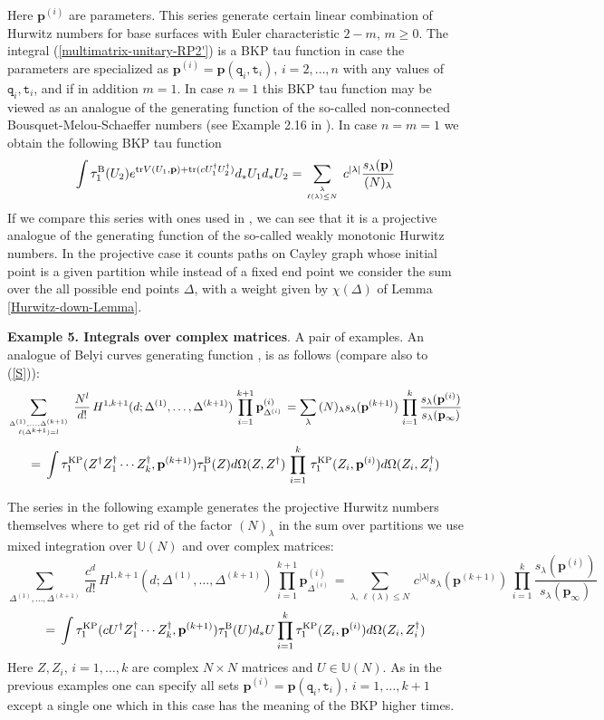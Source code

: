 \documentclass[a4paper,10pt]{article}
\newcommand{\bpow}{\mathbf{p}}
\theoremstyle{plain}
\theoremstyle{remark}
\def\tr{\mathrm {tr}}
\def\be{\begin{equation}}
\def\ee{\end{equation}}
\def\tr{\mathrm {tr}}
\begin{document}
Here $\bpow^{(i)}$ are parameters. This series generate certain linear combination of Hurwitz numbers for base surfaces
with Euler characteristic $2-m,\,m\ge 0$.
The integral (\ref{multimatrix-unitary-RP2'}) is a BKP tau function in case the parameters
are specialized as $\bpow^{(i)}=\bpow(\texttt{q}_i,\texttt{t}_i),\,i=2,\dots,n$ with any values of
$\texttt{q}_i,\texttt{t}_i$,
and if in addition $m=1$. In case $n=1$ this BKP tau function may be viewed as an analogue of the generating function of
the so-called non-connected Bousquet-Melou-Schaeffer numbers
(see Example 2.16 in \cite{KazarianLando}).
In case $n=m=1$ we obtain the following BKP tau function
\[
\int \tau^{\rm B}_1(U_2)  e^{\tr V(U_1,\bpow)+\tr (cU_1^\dag U_2^\dag)}d_*U_1d_*U_2 =
\sum_{\lambda\atop \ell(\lambda)\le N}\,c^{|\lambda|}\frac{s_\lambda(\bpow)}{(N)_\lambda}
\]
If we compare this series with ones used in \cite{Goulden-Paquet-Novak},\cite{Harnad-2014} we can see that it is a projective analogue of the generating function of the
so-called weakly monotonic Hurwitz numbers. In the projective case it counts paths on Cayley graph whose initial point is a given partition
while instead of a fixed end point we consider the sum over the all possible end points $\Delta$, 
with a weight given by $\chi(\Delta)$ of Lemma \ref{Hurwitz-down-Lemma}.



{\bf Example 5. Integrals over complex matrices}.
A pair of examples. 
An analogue of Belyi curves generating function \cite{Zog},\cite{Chekhov-2014} is as follows
 (compare also to (\ref{S})):
\be
\sum_{ \Delta^{(1)},\dots,\Delta^{(k+1)}\atop \ell(\Delta^{k+1})=l}\,\frac{N^l}{d!}\,
H^{1,k+1}(d;\Delta^{(1)},\dots,\Delta^{(k+1)})\,
\prod_{i=1}^{k+1} \bpow^{(i)}_{\Delta^{(i)}}\,
=\sum_{\lambda}\,(N)_\lambda s_\lambda(\bpow^{(k+1)})\,
\prod_{i=1}^{k}\frac{s_\lambda(\bpow^{(i)})}{s_\lambda(\bpow_\infty)}
\ee
\be
=\,\int \tau_1^{\rm KP}(Z^\dag Z_1^\dag \cdots Z_k^\dag,\bpow^{(k+1)})\tau_1^{\rm B}(Z)d\Omega(Z,Z^\dag)
\,\prod_{i=1}^{k}\,\tau_1^{\rm KP}(Z_i,\bpow^{(i)})  d\Omega(Z_i,Z_i^\dag)
\ee

The series in the following example generates the projective Hurwitz numbers themselves where to get rid
of the factor $(N)_\lambda$ in the sum over partitions we use mixed integration over $\mathbb{U}(N)$ and over
complex matrices:
\be
\sum_{ \Delta^{(1)},\dots,\Delta^{(k+1)}}\,\frac{c^d}{d!}\,
H^{1,k+1}(d;\Delta^{(1)},\dots,\Delta^{(k+1)})\,
\prod_{i=1}^{k+1} \bpow^{(i)}_{\Delta^{(i)}}\,
=\sum_{\lambda,\,\ell(\lambda)\le N}\,c^{|\lambda|} s_\lambda(\bpow^{(k+1)})\,
\prod_{i=1}^k\frac{s_\lambda(\bpow^{(i)})}{s_\lambda(\bpow_\infty)}
\ee
\be
=\,\int \tau_1^{\rm KP}(c U^\dag Z_1^\dag \cdots Z_k^\dag,\bpow^{(k+1)})\tau_1^{\rm B}(U)d_*U \prod_{i=1}^k
\tau_1^{\rm KP}(Z_i,\bpow^{(i)}) d\Omega(Z_i,Z_i^\dag)
\ee
Here $Z,Z_i,\,i=1,\dots,k$ are complex $N\times N$ matrices and $U\in\mathbb{U}(N)$. As in the previous examples
one can specify all sets $\bpow^{(i)}=\bpow(\texttt{q}_i,\texttt{t}_i),\,i=1,\dots,k+1$ except a single one which in 
this case has the meaning of the BKP higher times.
\end{document}
